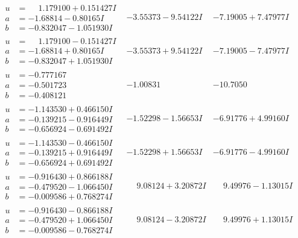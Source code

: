 \documentclass[1p]{elsarticle_modified}
\theoremstyle{definition}
\begin{document}
$$\begin{array}{c|c|c}
\begin{aligned}
u &= \phantom{-}1.179100 + 0.151427 I \\
a &= -1.68814 - 0.80165 I \\
b &= -0.832047 - 1.051930 I\end{aligned}
 & -3.55373 - 9.54122 I & -7.19005 + 7.47977 I \\ \hline\begin{aligned}
u &= \phantom{-}1.179100 - 0.151427 I \\
a &= -1.68814 + 0.80165 I \\
b &= -0.832047 + 1.051930 I\end{aligned}
 & -3.55373 + 9.54122 I & -7.19005 - 7.47977 I \\ \hline\begin{aligned}
u &= -0.777167\phantom{ +0.000000I} \\
a &= -0.501723\phantom{ +0.000000I} \\
b &= -0.408121\phantom{ +0.000000I}\end{aligned}
 & -1.00831\phantom{ +0.000000I} & -10.7050\phantom{ +0.000000I} \\ \hline\begin{aligned}
u &= -1.143530 + 0.466150 I \\
a &= -0.139215 - 0.916449 I \\
b &= -0.656924 - 0.691492 I\end{aligned}
 & -1.52298 - 1.56653 I & -6.91776 + 4.99160 I \\ \hline\begin{aligned}
u &= -1.143530 - 0.466150 I \\
a &= -0.139215 + 0.916449 I \\
b &= -0.656924 + 0.691492 I\end{aligned}
 & -1.52298 + 1.56653 I & -6.91776 - 4.99160 I \\ \hline\begin{aligned}
u &= -0.916430 + 0.866188 I \\
a &= -0.479520 - 1.066450 I \\
b &= -0.009586 + 0.768274 I\end{aligned}
 & \phantom{-}9.08124 + 3.20872 I & \phantom{-}9.49976 - 1.13015 I \\ \hline\begin{aligned}
u &= -0.916430 - 0.866188 I \\
a &= -0.479520 + 1.066450 I \\
b &= -0.009586 - 0.768274 I\end{aligned}
 & \phantom{-}9.08124 - 3.20872 I & \phantom{-}9.49976 + 1.13015 I \\ \hline\begin{aligned}

\end{aligned}
\end{array}$$
\end{document}
